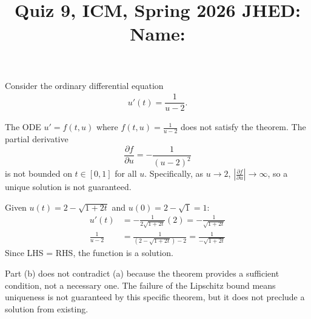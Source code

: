 \documentclass[reqno, answers]{exam}
\title{\normalsize{Quiz 9, ICM, Spring 2026 \hspace{1ex} JHED: \underline{\hspace{20ex}} \hspace{2ex} Name: \underline{\hspace{40ex}}}}
\author{}
\date{}
\begin{document}
\maketitle
\vspace{-2cm} %

\begin{questions}
  \question
  Consider the ordinary differential equation
  \begin{align*}
    u'(t) = \dfrac{1}{u - 2}.
  \end{align*}

  \begin{solution}
    The ODE $u' = f(t, u)$ where $f(t, u) = \frac{1}{u-2}$ does not satisfy the theorem. The partial derivative
    $$\frac{\partial f}{\partial u} = -\frac{1}{(u-2)^2}$$
    is not bounded on $t \in [0, 1]$ for all $u$. Specifically, as $u \to 2$, $|\frac{\partial f}{\partial u}| \to \infty$, so a unique solution is not guaranteed.

    Given $u(t) = 2 - \sqrt{1 + 2t}$ and $u(0) = 2 - \sqrt{1} = 1$:
    \begin{align*}
      u'(t)         & = -\frac{1}{2\sqrt{1+2t}}(2) = -\frac{1}{\sqrt{1+2t}}      \\
      \frac{1}{u-2} & = \frac{1}{(2 - \sqrt{1+2t}) - 2} = \frac{1}{-\sqrt{1+2t}}
    \end{align*}
    Since LHS = RHS, the function is a solution.

    Part (b) does not contradict (a) because the theorem provides a sufficient condition, not a necessary one. The failure of the Lipschitz bound means uniqueness is not guaranteed by this specific theorem, but it does not preclude a solution from existing.


\end{solution}
\end{questions}
\end{document}
